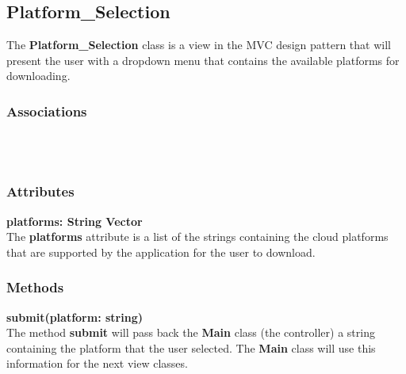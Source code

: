 \subsection{Platform\_Selection}
The \textbf{Platform\_Selection} class is a view in the MVC design pattern that will present
the user with a dropdown menu that contains the available platforms for downloading.

\subsubsection{Associations}
\textbf{} \\

\textbf{} \\

\subsubsection{Attributes}
\textbf{platforms: String Vector} \\
The \textbf{platforms} attribute is a list of the strings containing the cloud platforms that
are supported by the application for the user to download.

\subsubsection{Methods}
\textbf{submit(platform: string)} \\
The method \textbf{submit} will pass back the \textbf{Main} class (the controller) a string
containing the platform that the user selected. The \textbf{Main} class will use this information
for the next view classes.
  
